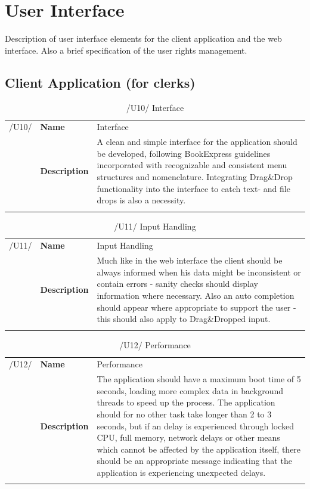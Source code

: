 \documentclass[11pt,a4paper,oneside,svgnames]{report}
\begin{document}
\chapter{User Interface}
Description of user interface elements for the client application and the web interface. Also a brief specification of the user rights management.

\section{Client Application (for clerks)}
\begin{table}[H]
\centering
\begin{tabular}{llp{8.75cm}}
\cellcolor{white}/U10/	& \textbf{Name}			& Interface\\
\cellcolor{white}		& \textbf{Description}	& A clean and simple interface for the application should be developed, following BookExpress guidelines incorporated with recognizable and consistent menu structures and nomenclature. Integrating Drag\&Drop functionality into the interface to catch text- and file drops is also a necessity.\\
\cellcolor{white}		\hfill \\
\end{tabular}
\caption{/U10/ Interface}
\label{tab:u10}
\end{table}

\begin{table}[H]
\centering
\begin{tabular}{llp{8.75cm}}
\cellcolor{white}/U11/	& \textbf{Name}			& Input Handling\\
\cellcolor{white}		& \textbf{Description}	& Much like in the web interface the client should be always informed when his data might be inconsistent or contain errors - sanity checks should display information where necessary. Also an auto completion should appear where appropriate to support the user - this should also apply to Drag\&Dropped input.\\
\cellcolor{white}		\hfill \\
\end{tabular}
\caption{/U11/ Input Handling}
\label{tab:u11}
\end{table}

\begin{table}[H]
\centering
\begin{tabular}{llp{8.75cm}}
\cellcolor{white}/U12/	& \textbf{Name}			& Performance\\
\cellcolor{white}		& \textbf{Description}	& The application should have a maximum boot time of 5 seconds, loading more complex data in background threads to speed up the process. The application should for no other task take longer than 2 to 3 seconds, but if an delay is experienced through locked CPU, full memory, network delays or other means which cannot be affected by the application itself, there should be an appropriate message indicating that the application is experiencing unexpected delays.\\
\cellcolor{white}		\hfill \\
\end{tabular}
\caption{/U12/ Performance}
\label{tab:u12}
\end{table}
\end{document}
